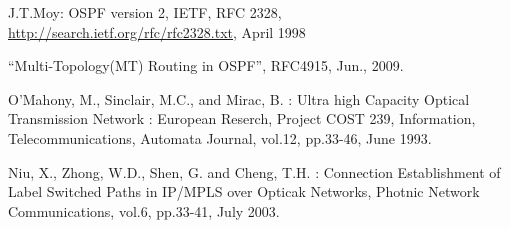 
\begin{thebibliography}{99}
	J.T.Moy: OSPF version 2, IETF, 
	RFC 2328, \url{http://search.ietf.org/rfc/rfc2328.txt}, April 1998
	
	“Multi-Topology(MT) Routing in OSPF”, RFC4915, Jun., 2009.
	
	O’Mahony, M., Sinclair, M.C., and Mirac, B. : Ultra high Capacity Optical Transmission Network : European
	Reserch, Project COST 239, Information, Telecommunications, Automata Journal, vol.12, pp.33-46, June
	1993.

	Niu, X., Zhong, W.D., Shen, G. and Cheng, T.H. : Connection Establishment of Label Switched Paths in
	IP/MPLS over Opticak Networks, Photnic Network Communications, vol.6, pp.33-41, July 2003.
	
	
\end{thebibliography}
